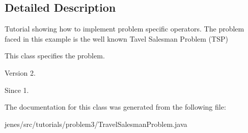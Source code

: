 \subsection{Detailed Description}
Tutorial showing how to implement problem specific operators. The problem faced in this example is the well known Tavel Salesman Problem (T\-S\-P)

This class specifies the problem.

\begin{DoxyVersion}{Version}
2. 
\end{DoxyVersion}
\begin{DoxySince}{Since}
1. 
\end{DoxySince}


The documentation for this class was generated from the following file\-:\begin{DoxyCompactItemize}
\item 
jenes/src/tutorials/problem3/Travel\-Salesman\-Problem.\-java\end{DoxyCompactItemize}
